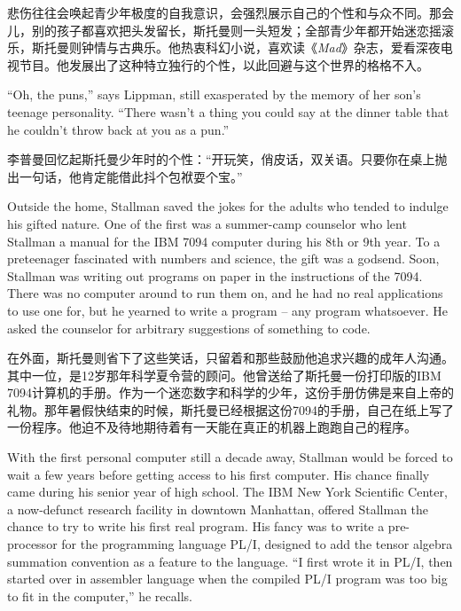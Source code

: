 \ifdefined\chs
悲伤往往会唤起青少年极度的自我意识，会强烈展示自己的个性和与众不同。那会儿，别的孩子都喜欢把头发留长，斯托曼则一头短发；全部青少年都开始迷恋摇滚乐，斯托曼则钟情与古典乐。他热衷科幻小说，喜欢读《\textit{Mad}》杂志，爱看深夜电视节目。他发展出了这种特立独行的个性，以此回避与这个世界的格格不入。
\fi

\ifdefined\eng
``Oh, the puns,'' says Lippman, still exasperated by the memory of her son's teenage personality. ``There wasn't a thing you could say at the dinner table that he couldn't throw back at you as a pun.''
\fi

\ifdefined\chs
李普曼回忆起斯托曼少年时的个性：``开玩笑，俏皮话，双关语。只要你在桌上抛出一句话，他肯定能借此抖个包袱耍个宝。''
\fi

\ifdefined\eng
Outside the home, Stallman saved the jokes for the adults who tended to indulge his gifted nature. One of the first was a summer-camp counselor who lent Stallman a manual for the IBM 7094 computer during his 8th or 9th year. To a preteenager fascinated with numbers and science, the gift was a godsend. Soon, Stallman was writing out programs on paper in the instructions of the 7094.  There was no computer around to run them on, and he had no real applications to use one for, but he yearned to write a program -- any program whatsoever.  He asked the counselor for arbitrary suggestions of something to code.
\fi

\ifdefined\chs
在外面，斯托曼则省下了这些笑话，只留着和那些鼓励他追求兴趣的成年人沟通。其中一位，是12岁那年科学夏令营的顾问。他曾送给了斯托曼一份打印版的IBM 7094计算机的手册。作为一个迷恋数字和科学的少年，这份手册仿佛是来自上帝的礼物。那年暑假快结束的时候，斯托曼已经根据这份7094的手册，自己在纸上写了一份程序。他迫不及待地期待着有一天能在真正的机器上跑跑自己的程序。
\fi

\ifdefined\eng
With the first personal computer still a decade away, Stallman would be forced to wait a few years before getting access to his first computer. His chance finally came during his senior year of high school.  The IBM New York Scientific Center, a now-defunct research facility in downtown Manhattan, offered Stallman the chance to try to write his first real program.  His fancy was to write a pre-processor for the programming language PL/I, designed to add the tensor algebra summation convention as a feature to the language. ``I first wrote it in PL/I, then started over in assembler language when the compiled PL/I program was too big to fit in the computer,'' he recalls.
\fi

